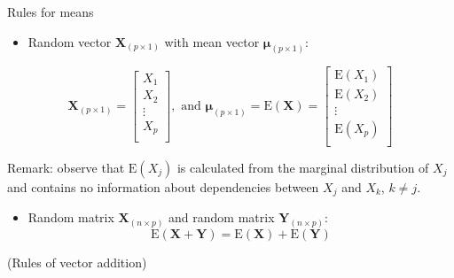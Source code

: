\documentclass[ignorenonframetext,]{beamer}
\providecommand{\tightlist}{%
  \setlength{\itemsep}{0pt}\setlength{\parskip}{0pt}}
\begin{document}
\begin{frame}

\begin{block}{Rules for means}

\begin{itemize}
\tightlist
\item
  Random vector \(\mathbf{X}_{(p\times 1)}\) with mean vector
  \(\mathbf{\mu}_{(p\times 1)}\):
\end{itemize}

\[\mathbf{X}_{(p\times 1)}=\left[ \begin{array}{c}X_1\\ X_2\\ \vdots\\ X_p\\ \end{array}\right], \text{ and }\mathbf{\mu}_{(p \times 1)}=\text{E}(\mathbf{X})=\left[ \begin{array}{c}\text{E}(X_1)\\ \text{E}(X_2)\\ \vdots\\ \text{E}(X_p)\\ \end{array}\right]\]

Remark: observe that \(\text{E}(X_j)\) is calculated from the marginal
distribution of \(X_j\) and contains no information about dependencies
between \(X_{j}\) and \(X_k\), \(k\neq j\).

\begin{itemize}
\tightlist
\item
  Random matrix \(\mathbf{X}_{(n\times p)}\) and random matrix
  \(\mathbf{Y}_{(n\times p)}\):
  \[\text{E}(\mathbf{X}+\mathbf{Y})=\text{E}(\mathbf{X})+\text{E}(\mathbf{Y})\]
\end{itemize}

(Rules of vector addition)

\end{block}

\end{frame}
\end{document}
